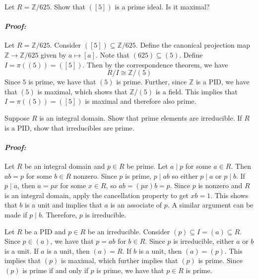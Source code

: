 \documentclass [12pt] {article}
\newcommand{\Z}{\mathbb{Z}}
\renewcommand{\it}[1]{\textit{{#1}}}
\newenvironment{problem}{\begin{tcolorbox}[title=Problem,colback=black!5!white,colframe=black!75!black]}{\end{tcolorbox}}
\newenvironment{response}{\begin{responseframe}\vspace{-10pt}\paragraph{\it{Proof:}}}{\end{responseframe}}
\begin{document}
\newpage
\begin{problem}
    Let $R=\Z/625$. Show that $([5])$ is a prime ideal. Is it maximal?
\end{problem}
\begin{response}
    Let $R=\Z/625$. Consider $([5])\subseteq \Z/625$. Define the canonical
    projection map $\Z\to \Z/625$ given by $a\mapsto [a]$. Note that
    $(625)\subseteq (5)$. Define $I=\pi((5))=([5])$. Then by the correspondence
    theorem, we have
    \[R/I\cong \Z/(5)\]
    Since $5$ is prime, we have that $(5)$ is prime. Further, since $\Z$ is a
    PID, we have that $(5)$ is maximal, which shows that $\Z/(5)$ is a field.
    This implies that $I=\pi((5))=([5])$ is maximal and therefore also prime.
\end{response}

\newpage
\begin{problem}
    Suppose $R$ is an integral domain. Show that prime elements are irreducible.
    If $R$ is a PID, show that irreducibles are prime.
\end{problem}
\begin{response}
    Let $R$ be an integral domain and $p\in R$ be prime. Let $a\mid p$ for some
    $a\in R$. Then $ab=p$ for some $b\in R$ nonzero. Since $p$ is prime,
    $p\mid ab$ so either $p\mid a$ or $p\mid b$. If $p\mid a$, then $a=px$ for
    some $x\in R$, so $ab=(px)b=p$. Since $p$ is nonzero and $R$ is an integral
    domain, apply the cancellation property to get $xb=1$. This shows that $b$
    is a unit and implies that $a$ is an associate of $p$. A similar argument
    can be made if $p\mid b$. Therefore, $p$ is irreducible.
    \vspace{1em}

    Let $R$ be a PID and $p \in R$ be an irreducible. Consider
    $(p)\subseteq I=(a)\subseteq R$. Since $p\in (a)$, we have that $p=ab$ for
    $b\in R$. Since $p$ is irreducible, either $a$ or $b$ is a unit. If $a$ is a
    unit, then $(a)=R$. If $b$ is a unit, then $(a)=(p)$. This implies that
    $(p)$ is maximal, which further implies that $(p)$ is prime. Since $(p)$ is
    prime if and only if $p$ is prime, we have that $p\in R$ is prime.
\end{response}
\end{document}
